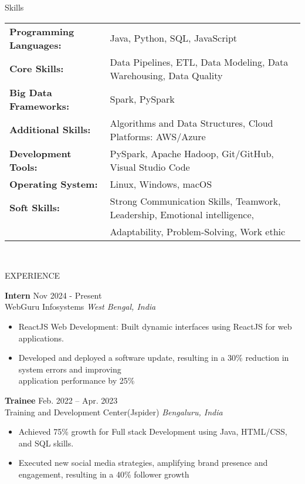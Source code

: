 \documentclass{resume} %
\begin{document}
\begin{rSection}{Skills}

\begin{tabular}{ @{} >{\bfseries}l @{\hspace{5ex}} l }
Programming Languages:  & Java, Python, SQL, JavaScript
\\
Core Skills: & Data Pipelines, ETL, Data Modeling, Data Warehousing, Data Quality\\
Big Data Frameworks:  & Spark, PySpark \\
Additional Skills: &Algorithms and Data Structures, Cloud Platforms: AWS/Azure\\
Development Tools:  & PySpark, Apache Hadoop, Git/GitHub, Visual Studio Code \\
Operating System: & Linux, Windows, macOS \\
Soft Skills: & Strong Communication Skills, Teamwork, Leadership, Emotional intelligence, \\& Adaptability, Problem-Solving, Work ethic 
\end{tabular}\\
\end{rSection}   

\begin{rSection}{EXPERIENCE}

\textbf{Intern} \hfill Nov 2024 - Present\\
WebGuru Infosystems \hfill \textit{West Bengal, India}
 \begin{itemize}
    \itemsep -3pt {} 
     \item ReactJS Web Development: Built dynamic interfaces using ReactJS for web applications.
    \item Developed and deployed a software update, resulting in a 30\% reduction in system errors and improving \\ application performance by 25\% 
 \end{itemize}
 
\textbf{Trainee} \hfill Feb. 2022 -- Apr. 2023\\
Training and Development Center(Jspider) \hfill \textit{Bengaluru, India}
 \begin{itemize}
    \itemsep -3pt {} 
     \item Achieved 75\% growth for Full stack Development using Java, HTML/CSS, and SQL skills.
    \item Executed new social media strategies, amplifying brand presence and engagement, resulting in a 40\% follower growth 
 \end{itemize}

\end{rSection} 
\end{document}
